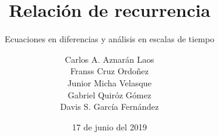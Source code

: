 \documentclass[
	graybox,
	envcountchap,
	sectrefs
]{svmono}
\date{17 de junio del 2019}
\begin{document}
\author{
	Carlos A. Aznarán Laos\\
	Franss Cruz Ordoñez\\
	Junior Micha Velasque\\
	Gabriel Quiróz Gómez\\
	Davis S. García Fernández
}
\title{Relación de recurrencia}
\subtitle{Ecuaciones en diferencias y análisis en escalas de tiempo}
\maketitle

\frontmatter



%
%
%
\end{document}
